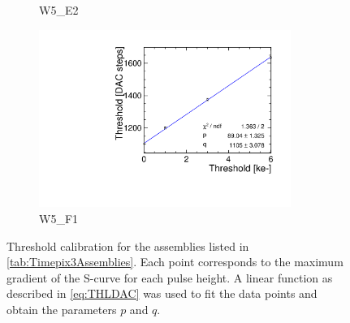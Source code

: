 \begin{figure}[htbp]
\begin{subfigure}[b]{0.45\textwidth}
    \caption{W5\_E2}
  \end{subfigure} \hfill
  \begin{subfigure}[b]{0.45\textwidth}
    \includegraphics[width=0.9\textwidth]{./figures/Calibration/THLcalibration_W0005_F01.pdf}
    \caption{W5\_F1}
  \end{subfigure}%
  \caption{Threshold calibration for the assemblies listed in
    \cref{tab:Timepix3Assemblies}. Each point corresponds to the
    maximum gradient of the S-curve for each pulse height. A linear
    function as described in \cref{eq:THLDAC} was used to fit the data
    points and obtain the parameters $p$ and $q$.}
  \label{fig:Timepix3_THL_Calibration}
\end{figure}




